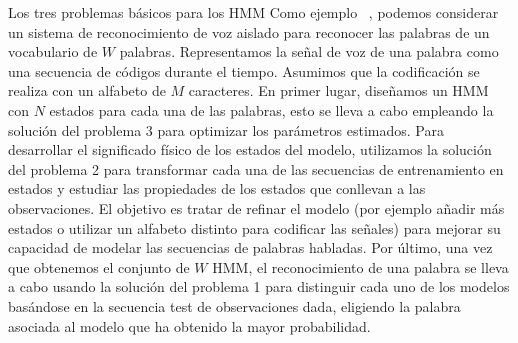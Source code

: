 \begin{section}{Los tres problemas básicos para los HMM}
Como ejemplo ~\cite{Rabiner}, podemos considerar un sistema de reconocimiento de voz aislado para reconocer las palabras de un vocabulario de $W$ palabras. Representamos la señal de voz de una palabra como una secuencia de códigos durante el tiempo. Asumimos que la codificación se realiza con un alfabeto de $M$ caracteres. En primer lugar, diseñamos un HMM con $N$ estados para cada una de las palabras, esto se lleva a cabo empleando la solución del problema 3 para optimizar los parámetros estimados. Para desarrollar el significado físico de los estados del modelo, utilizamos la solución del problema 2 para transformar cada una de las secuencias de entrenamiento en estados y estudiar las propiedades de los estados que conllevan a las observaciones. El objetivo es tratar de refinar el modelo (por ejemplo añadir más estados o utilizar un alfabeto distinto para codificar las señales) para mejorar su capacidad de modelar las secuencias de palabras habladas. Por último, una vez que obtenemos el conjunto de $W$ HMM, el reconocimiento de una palabra se lleva a cabo usando la solución del problema 1 para distinguir cada uno de los modelos basándose en la secuencia test de observaciones dada, eligiendo la palabra asociada al modelo que ha obtenido la mayor probabilidad.












\end{section}